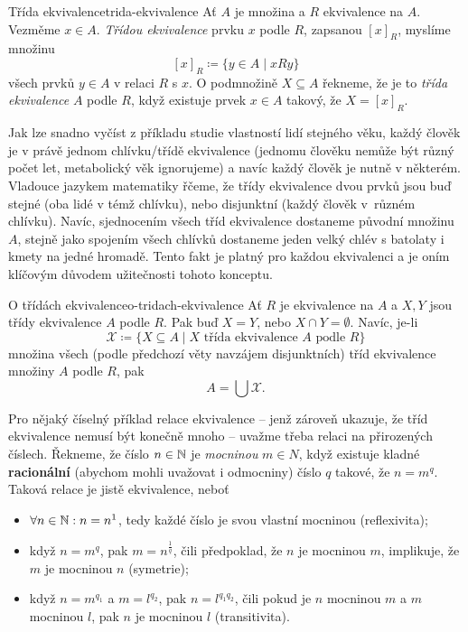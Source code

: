 \begin{definition}{Třída ekvivalence}{trida-ekvivalence}
 Ať $A$ je množina a $R$ ekvivalence na $A$. Vezměme $x \in A$. \emph{Třídou
 ekvivalence} prvku $x$ podle $R$, zapsanou $[x]_R$, myslíme množinu
 \[
  [x]_R \coloneqq \{y \in A \mid xRy\}
 \]
 všech prvků $y \in A$ v relaci $R$ s $x$. O podmnožině $X \subseteq A$ řekneme,
 že je to \emph{třída ekvivalence} $A$ podle $R$, když existuje prvek $x \in A$
 takový, že $X = [x]_R$.
\end{definition}

Jak lze snadno vyčíst z příkladu studie vlastností lidí stejného věku, každý
člověk je v právě jednom chlívku/třídě ekvivalence (jednomu člověku nemůže být
různý počet let, metabolický věk ignorujeme) a navíc každý člověk je nutně v
některém. Vladouce jazykem matematiky řčeme, že třídy ekvivalence dvou prvků
jsou buď stejné (oba lidé v témž chlívku), nebo disjunktní (každý člověk
v~různém chlívku). Navíc, sjednocením všech tříd ekvivalence dostaneme původní
množinu $A$, stejně jako spojením všech chlívků dostaneme jeden velký chlév s
batolaty i kmety na jedné hromadě. Tento fakt je platný pro každou ekvivalenci a
je oním klíčovým důvodem užitečnosti tohoto konceptu.

\begin{proposition}{O třídách ekvivalence}{o-tridach-ekvivalence}
 Ať $R$ je ekvivalence na $A$ a $X,Y$ jsou třídy ekvivalence $A$ podle $R$. Pak
 buď $X = Y$, nebo $X \cap Y = \emptyset$. Navíc, je-li 
 \[
  \mathcal{X} \coloneqq \{X \subseteq A\mid X \text{ třída ekvivalence } A
  \text{ podle } R\}
 \]
 množina všech (podle předchozí věty navzájem disjunktních) tříd ekvivalence
 množiny $A$ podle $R$, pak
 \[
  A = \bigcup \mathcal{X}.
 \]
\end{proposition}

Pro nějaký číselný příklad relace ekvivalence -- jenž zároveň ukazuje, že tříd
ekvivalence nemusí být konečně mnoho -- uvažme třeba relaci 
na přirozených číslech. Řekneme, že číslo $n \in \mathbb{N}$ je \emph{mocninou} $m \in
N$, když existuje kladné \textbf{racionální} (abychom mohli uvažovat i
odmocniny) číslo $q$ takové, že $n = m^{q}$. Taková relace je jistě ekvivalence,
neboť
\begin{itemize}
 \item $ \forall n \in \mathbb{N}: n = n^{1}$, tedy každé číslo je svou vlastní
  mocninou (reflexivita);
 \item když $n = m^{q}$, pak $m = n^{\frac{1}{q}}$, čili předpoklad, že $n$ je
  mocninou $m$, implikuje, že $m$ je mocninou $n$ (symetrie);
 \item když $n = m^{q_1}$ a $m = l^{q_2}$, pak $n = l^{q_1q_2}$, čili pokud je
  $n$ mocninou $m$ a $m$ mocninou $l$, pak $n$ je mocninou $l$ (transitivita).
\end{itemize}

